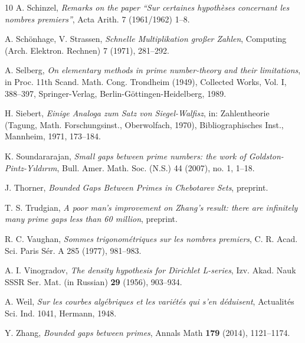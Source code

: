 \documentclass{bmcart}
\theoremstyle{plain}
\theoremstyle{definition}
\begin{document}
\begin{backmatter}
\begin{thebibliography}{10}
 A. Schinzel, \emph{Remarks on the paper ``Sur
    certaines hypoth\`eses concernant les nombres premiers''}, Acta
  Arith. 7 (1961/1962) 1--8.

 A. Sch\"{o}nhage, V. Strassen, \emph{Schnelle
    {M}ultiplikation gro\ss{}er {Z}ahlen}, Computing
  (Arch. Elektron. Rechnen) 7 (1971), 281--292.

 A. Selberg, \emph{On elementary methods in prime
    number-theory and their limitations}, in Proc. 11th
  Scand. Math. Cong. Trondheim (1949), Collected Works, Vol. I,
  388--397, Springer-Verlag, Berlin-G\"ottingen-Heidelberg, 1989.

 H. Siebert, \emph{Einige Analoga zum Satz von
    Siegel-Walfisz}, in: Zahlentheorie (Tagung, Math. Forschungsinst.,
  Oberwolfach, 1970), Bibliographisches Inst., Mannheim, 1971,
  173--184.

 K. Soundararajan, \emph{Small gaps between prime
    numbers: the work of Goldston-Pintz-Y{\i}ld{\i}r{\i}m},
  Bull. Amer. Math. Soc. (N.S.) 44 (2007), no. 1, 1--18.

J. Thorner, \emph{Bounded Gaps Between Primes in Chebotarev Sets}, preprint.

 T. S. Trudgian, \emph{A poor man's improvement on
    Zhang's result: there are infinitely many prime gaps less than 60
    million}, preprint.

 R. C. Vaughan, \emph{Sommes trigonom\'etriques sur
    les nombres premiers}, C. R. Acad. Sci. Paris S\'er. A 285 (1977),
  981--983.

A. I. Vinogradov, \emph{The density hypothesis for Dirichlet L-series}, Izv. Akad. Nauk SSSR Ser. Mat. (in Russian) \textbf{29} (1956), 903--934.


 A. Weil, \emph{Sur les courbes alg\'ebriques et les
    vari\'et\'es qui s'en d\'eduisent}, Actualit\'es Sci. Ind. 1041,
  Hermann, 1948.

 Y. Zhang, \emph{Bounded gaps between primes}, Annals Math \textbf{179} (2014), 1121--1174.

\end{thebibliography}






\end{backmatter}
\end{document}
